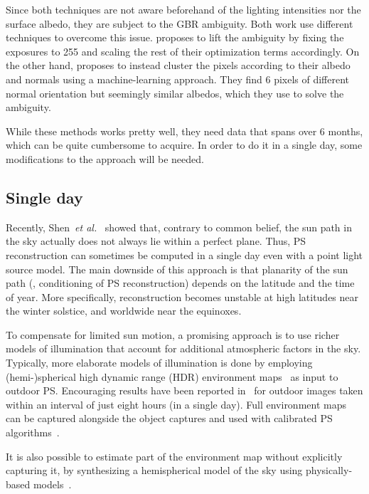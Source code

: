 Since both techniques are not aware beforehand of the lighting intensities nor the surface albedo, they are subject to the GBR ambiguity. Both work use different techniques to overcome this issue. \cite{abrams-eccv-12} proposes to lift the ambiguity by fixing the exposures to 255 and scaling the rest of their optimization terms accordingly. On the other hand, \cite{ackermann-cvpr-12} proposes to instead cluster the pixels according to their albedo and normals using a machine-learning approach. They find 6 pixels of different normal orientation but seemingly similar albedos, which they use to solve the ambiguity.

While these methods works pretty well, they need data that spans over 6 months, which can be quite cumbersome to acquire. In order to do it in a single day, some modifications to the approach will be needed.

\subsection{Single day}
Recently, Shen~{\em et al.}~\cite{shen-pg-14} showed that, contrary to common belief, the sun path in the sky actually does not always lie within a perfect plane. Thus, PS reconstruction can sometimes be computed in a single day even with a point light source model. The main downside of this approach is that planarity of the sun path (\ie, conditioning of PS reconstruction) depends on the latitude and the time of year. More specifically, reconstruction becomes unstable at high latitudes near the winter solstice, and worldwide near the equinoxes.

To compensate for limited sun motion, a promising approach is to use richer models of illumination that account for additional atmospheric factors in the sky. Typically, more elaborate models of illumination is done by employing (hemi-)spherical high dynamic range (HDR) environment maps~\cite{debevec-siggraph-98,reinhard-book-05} as input to outdoor PS. Encouraging results have been reported in~\cite{yu-iccp-13} for outdoor images taken within an interval of just eight hours (in a single day). Full environment maps can be captured alongside the object captures and used with calibrated PS algorithms~\cite{yu-iccp-13,shi-3dv-14,hung-wacv-15}.


It is also possible to estimate part of the environment map without explicitly capturing it, by synthesizing a hemispherical model of the sky using physically-based models~\cite{inose-tcva-13,jung-cvpr-15}.

